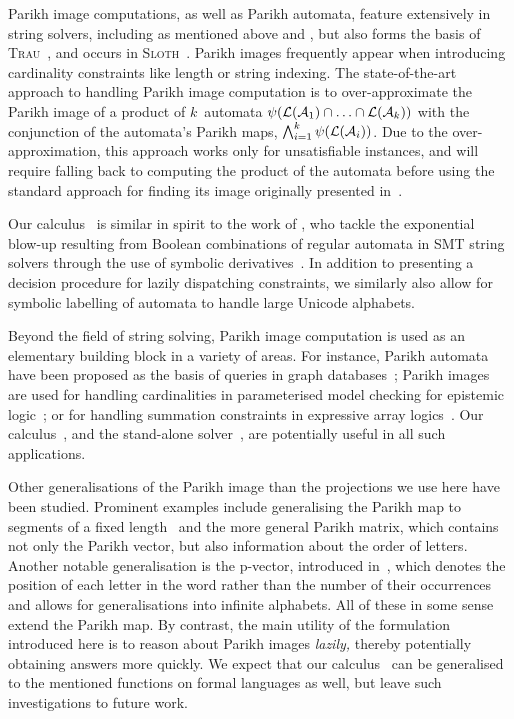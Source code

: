 Parikh image computations, as well as Parikh automata, feature extensively in
string solvers, including as mentioned above \Ostrich{} and \OstrichPlus{}
\cite{ostrich,ostrich-plus}, but also forms the basis of
\textsc{Trau}~\cite{trau-pldi},
and occurs in \textsc{Sloth}~\cite{sloth}. Parikh images frequently appear when
introducing cardinality constraints like length or string indexing. The
state-of-the-art approach to handling Parikh image computation is to
over-approximate the Parikh image of a product of $k$~automata
$\operatorname{\psi}(\operatorname{\mathcal{L}}(\mathcal{A}_1) \cap \ldots \cap \operatorname{\mathcal{L}}(\mathcal{A}_k))$
with the conjunction of the automata's Parikh maps, $\bigwedge_{i=1}^{k}
\operatorname{\psi}(\operatorname{\mathcal{L}}(\mathcal{A}_i))$. Due to the over-approximation,
this approach works only for unsatisfiable instances,
and will require falling back to computing the product of the automata before
using the standard approach for finding its image originally presented
in~\cite{generate-parikh-image}.

Our calculus~\Calculus{} is similar in spirit to the work
of \citeauthor{symbolic-boolean-derivatives}, who tackle the exponential
blow-up resulting from Boolean combinations
of regular automata in SMT string solvers
through the use of symbolic derivatives~\cite{symbolic-boolean-derivatives}.
In addition to presenting a decision procedure for lazily dispatching
constraints, we similarly also allow for symbolic labelling of automata to
handle large Unicode alphabets.

Beyond the field of string solving, Parikh image computation is used
as an elementary building block in a variety of areas.  For instance,
Parikh automata have been proposed as the basis of queries in graph
databases~\cite{graph-queries}; Parikh images are used for handling
cardinalities in parameterised model checking for epistemic
logic~\cite{epistemic-logic}; or for handling summation constraints in
expressive array logics~\cite{rodrigoRaya}. Our calculus~\Calculus{},
and the stand-alone solver~\Catra{},
are potentially useful in all such applications.

Other generalisations of the Parikh image than the projections we use here
have been studied. Prominent examples include generalising the Parikh map to
segments of a fixed length~\cite{KARHUMAKI1980155} and the more general Parikh
matrix, which contains not only the Parikh vector, but also information about
the order of letters. Another notable generalisation is the p-vector, introduced
in~\cite{infinite-words}, which denotes the position of each letter in the word
rather than the number of their occurrences and allows for generalisations into
infinite alphabets. All of these in some sense extend the Parikh map. By
contrast, the main utility of the formulation introduced here is to reason
about Parikh images \emph{lazily,}
thereby potentially obtaining answers more quickly. We expect that our
calculus~\Calculus{} can be generalised to the mentioned functions on
formal languages as well, but leave such investigations to future work.


